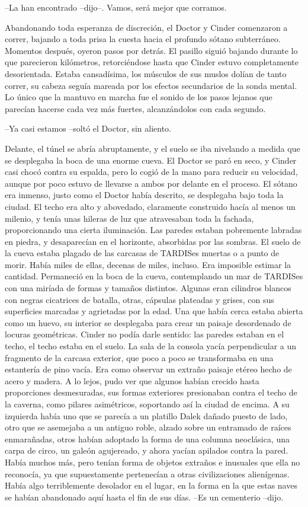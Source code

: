 --La han encontrado --dijo--. Vamos, será mejor que corramos.

Abandonando toda esperanza de discreción, el Doctor y Cinder comenzaron a correr, bajando a toda prisa la cuesta hacia el profundo sótano subterráneo. Momentos después, oyeron pasos por detrás.
El pasillo siguió bajando durante lo que parecieron kilómetros, retorciéndose hasta que Cinder estuvo completamente desorientada. Estaba cansadísima, los músculos de sus muslos dolían de tanto correr, su cabeza seguía mareada por los efectos secundarios de la sonda mental. Lo único que la mantuvo en marcha fue el sonido de los pasos lejanos que parecían hacerse cada vez más fuertes, alcanzándolos con cada segundo.

--Ya casi estamos --soltó el Doctor, sin aliento.

Delante, el túnel se abría abruptamente, y el suelo se iba nivelando a medida que se desplegaba la boca de una enorme cueva. El Doctor se paró en seco, y Cinder casi chocó contra su espalda, pero lo cogió de la mano para reducir su velocidad, aunque por poco estuvo de llevarse a ambos por delante en el proceso.
El sótano era inmenso, justo como el Doctor había descrito, se desplegaba bajo toda la ciudad. El techo era alto y abovedado, claramente construido hacía al menos un milenio, y tenía unas hileras de luz que atravesaban toda la fachada, proporcionando una cierta iluminación. Las paredes estaban pobremente labradas en piedra, y desaparecían en el horizonte, absorbidas por las sombras.
El suelo de la cueva estaba plagado de las carcasas de TARDISes muertas o a punto de morir. Había miles de ellas, decenas de miles, incluso. Era imposible estimar la cantidad.
Permaneció en la boca de la cueva, contemplando un mar de TARDISes con una miríada de formas y tamaños distintos. Algunas eran cilindros blancos con negras cicatrices de batalla, otras, cápsulas plateadas y grises, con sus superficies marcadas y agrietadas por la edad.
Una que había cerca estaba abierta como un huevo, su interior se desplegaba para crear un paisaje desordenado de locuras geométricas. Cinder no podía darle sentido: las paredes estaban en el techo, el techo estaba en el suelo. La sala de la consola yacía perpendicular a un fragmento de la carcasa exterior, que poco a poco se transformaba en una estantería de pino vacía. Era como observar un extraño paisaje etéreo hecho de acero y madera.
A lo lejos, pudo ver que algunos habían crecido hasta proporciones desmesuradas, sus formas exteriores presionaban contra el techo de la caverna, como pilares asimétricos, soportando así la ciudad de encima.
A su izquierda había uno que se parecía a un platillo Dalek dañado puesto de lado, otro que se asemejaba a un antiguo roble, alzado sobre un entramado de raíces enmarañadas, otros habían adoptado la forma de una columna neoclásica, una carpa de circo, un galeón agujereado, y ahora yacían apilados contra la pared. Había muchos más, pero tenían forma de objetos extraños e inusuales que ella no reconocía, ya que supuestamente pertenecían a otras civilizaciones alienígenas.
Había algo terriblemente desolador en el lugar, en la forma en la que estas naves se habían abandonado aquí hasta el fin de sus días.
--Es un cementerio --dijo.

